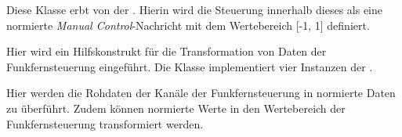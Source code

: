 Diese Klasse erbt von der . Hierin wird die Steuerung innerhalb dieses \Pack[s] als eine normierte \textit{Manual Control}-Nachricht mit dem Wertebereich [-1, 1] definiert.


Hier wird ein Hilfskonstrukt für die Transformation von Daten der Funkfernsteuerung eingeführt. Die Klasse implementiert vier Instanzen der .


Hier werden die Rohdaten der Kanäle der Funkfernsteuerung in normierte Daten zu überführt. Zudem können normierte Werte in den Wertebereich der Funkfernsteuerung transformiert werden.

